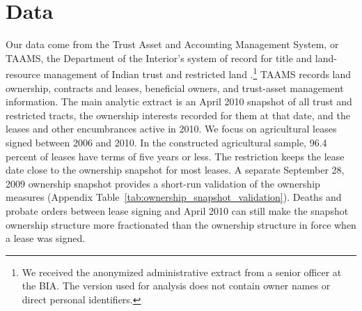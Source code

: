 \documentclass[12pt]{article}
\begin{document}
\section{Data} \label{Data}

Our data come from the Trust Asset and Accounting Management System, or TAAMS, the Department of the Interior's system of record for title and land-resource management of Indian trust and restricted land \citep{DOITAAMSSORN2014}.\footnote{We received the anonymized administrative extract from a senior officer at the BIA. The version used for analysis does not contain owner names or direct personal identifiers.} TAAMS records land ownership, contracts and leases, beneficial owners, and trust-asset management information. The main analytic extract is an April 2010 snapshot of all trust and restricted tracts, the ownership interests recorded for them at that date, and the leases and other encumbrances active in 2010. We focus on agricultural leases signed between 2006 and 2010. In the constructed agricultural sample, 96.4 percent of leases have terms of five years or less. The restriction keeps the lease date close to the ownership snapshot for most leases. A separate September 28, 2009 ownership snapshot provides a short-run validation of the ownership measures (Appendix Table~\ref{tab:ownership_snapshot_validation}). Deaths and probate orders between lease signing and April 2010 can still make the snapshot ownership structure more fractionated than the ownership structure in force when a lease was signed.
\end{document}
